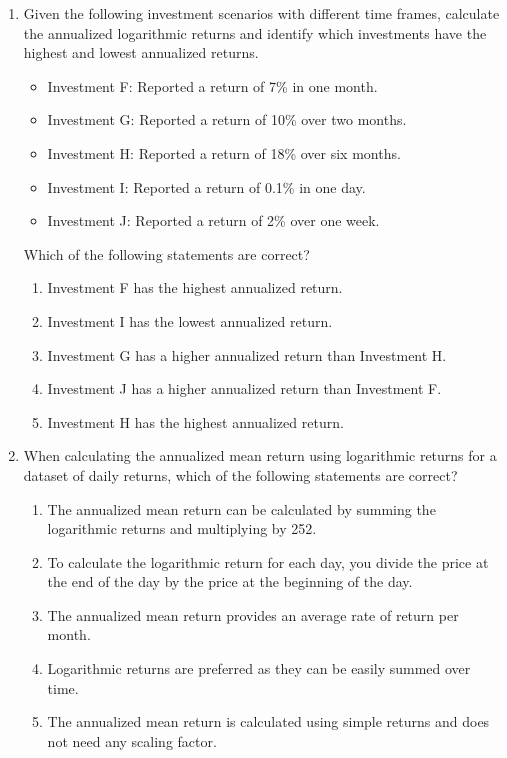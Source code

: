 \documentclass{article}
\begin{document}
\begin{enumerate}
    \item Given the following investment scenarios with different time frames, calculate the annualized logarithmic returns and identify which investments have the highest and lowest annualized returns.
    \begin{itemize}
        \item Investment F: Reported a return of 7\% in one month.
        \item Investment G: Reported a return of 10\% over two months.
        \item Investment H: Reported a return of 18\% over six months.
        \item Investment I: Reported a return of 0.1\% in one day.
        \item Investment J: Reported a return of 2\% over one week.
    \end{itemize}
    Which of the following statements are correct?

    \begin{enumerate}
        \item Investment F has the highest annualized return.
        \item Investment I has the lowest annualized return.
        \item Investment G has a higher annualized return than Investment H.
        \item Investment J has a higher annualized return than Investment F.
        \item Investment H has the highest annualized return.
    \end{enumerate}

    \item When calculating the annualized mean return using logarithmic returns for a dataset of daily returns, which of the following statements are correct?

    \begin{enumerate}
        \item The annualized mean return can be calculated by summing the logarithmic returns and multiplying by 252.
        \item To calculate the logarithmic return for each day, you divide the price at the end of the day by the price at the beginning of the day.
        \item The annualized mean return provides an average rate of return per month.
        \item Logarithmic returns are preferred as they can be easily summed over time.
        \item The annualized mean return is calculated using simple returns and does not need any scaling factor.
    \end{enumerate}


\end{enumerate}
\end{document}
